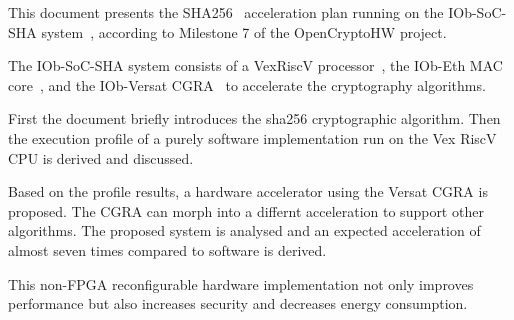 This document presents the SHA256~\cite{SHA_NIST_FIPS} acceleration plan
running on the IOb-SoC-SHA system~\cite{iob-soc-sha}, according to Milestone 7
of the OpenCryptoHW project.

The IOb-SoC-SHA system consists of a VexRiscV processor~\cite{bla}, the IOb-Eth
MAC core~\cite{iob-eth}, and the IOb-Versat CGRA~\cite{iob-versat} to accelerate
the cryptography algorithms.

First the document briefly introduces the sha256 cryptographic algorithm. Then
the execution profile of a purely software implementation run on the Vex RiscV
CPU is derived and discussed.

Based on the profile results, a hardware accelerator using the Versat CGRA is
proposed. The CGRA can morph into a differnt acceleration to support other
algorithms. The proposed system is analysed and an expected acceleration of
almost seven times compared to software is derived.

This non-FPGA reconfigurable hardware implementation not only improves
performance but also increases security and decreases energy consumption.
